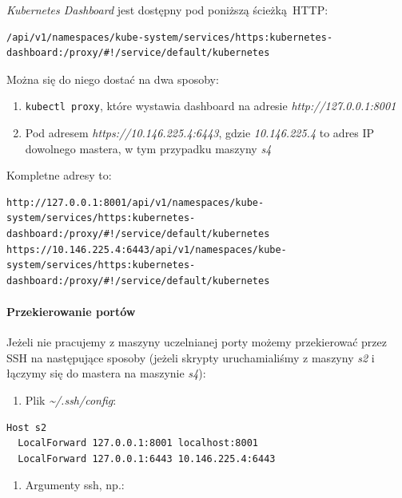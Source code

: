 \documentclass[a4paper,12pt,twoside,openany]{report}
\providecommand{\tightlist}{%
  \setlength{\itemsep}{0pt}\setlength{\parskip}{0pt}}
\newcommand{\passthrough}[1]{#1}
\begin{document}
\emph{Kubernetes Dashboard} jest dostępny pod poniższą ścieżką~HTTP:

\begin{lstlisting}
/api/v1/namespaces/kube-system/services/https:kubernetes-dashboard:/proxy/#!/service/default/kubernetes
\end{lstlisting}

Można się do niego dostać na dwa sposoby:

\begin{enumerate}
\def\labelenumi{\arabic{enumi}.}
\tightlist
\item
  \passthrough{\lstinline!kubectl proxy!}, które wystawia dashboard na
  adresie \emph{http://127.0.0.1:8001}
\item
  Pod adresem \emph{https://10.146.225.4:6443}, gdzie
  \emph{10.146.225.4} to adres IP dowolnego mastera, w tym przypadku
  maszyny \emph{s4}
\end{enumerate}

Kompletne adresy to:

\begin{lstlisting}
http://127.0.0.1:8001/api/v1/namespaces/kube-system/services/https:kubernetes-dashboard:/proxy/#!/service/default/kubernetes
https://10.146.225.4:6443/api/v1/namespaces/kube-system/services/https:kubernetes-dashboard:/proxy/#!/service/default/kubernetes
\end{lstlisting}

\hypertarget{przekierowanie-portuxf3w}{%
\paragraph{Przekierowanie portów}\label{przekierowanie-portuxf3w}}

Jeżeli nie pracujemy z maszyny uczelnianej porty możemy przekierować
przez SSH na następujące sposoby (jeżeli skrypty uruchamialiśmy z
maszyny \emph{s2} i łączymy się do mastera na maszynie \emph{s4}):

\begin{enumerate}
\def\labelenumi{\arabic{enumi}.}
\tightlist
\item
  Plik \emph{\textasciitilde{}/.ssh/config}:
\end{enumerate}

\begin{lstlisting}
Host s2
  LocalForward 127.0.0.1:8001 localhost:8001
  LocalForward 127.0.0.1:6443 10.146.225.4:6443
\end{lstlisting}

\begin{enumerate}
\def\labelenumi{\arabic{enumi}.}
\setcounter{enumi}{1}
\tightlist
\item
  Argumenty ssh, np.:
\end{enumerate}
\end{document}
